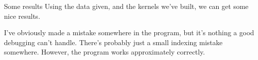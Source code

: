 \documentclass[xcolor=svgnames]{beamer}
\begin{document}
\begin{frame}{Some results}
 Using the data given, and the kernels we've built, we can get some nice results.
 
 \begin{center}
 \begin{figure}
  \end{figure}
 \end{center}
 
 I've obviously made a mistake somewhere in the program, but it's nothing a good debugging can't handle. There's probably just a small indexing mistake somewhere. However, the program works approximately correctly.

\end{frame}
\end{document}
